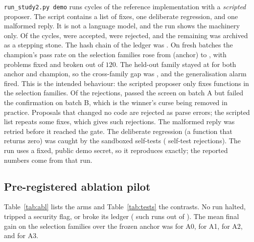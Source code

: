 \documentclass[11pt]{article}
\begin{document}
\texttt{run\_study2.py demo} runs \DemoCycles{} cycles of the reference implementation with a \emph{scripted} proposer. The script contains a list of fixes, one deliberate regression, and one malformed reply. It is not a language model, and the run shows the machinery only.
Of the \DemoCycles{} cycles, \DemoAcc{} were accepted, \DemoRej{} were rejected, and the remaining \DemoStep{} was archived as a stepping stone. The hash chain of the ledger was \DemoLedger.
On fresh batches the champion's pass rate on the selection families rose from \DemoAnchor{} (anchor) to \DemoChamp{}, with \DemoFixed{} problems fixed and \DemoBroken{} broken out of $120$.
The held-out family stayed at \DemoHeldA{} for both anchor and champion, so the cross-family gap was \DemoGap{}, and the generalisation alarm fired. This is the intended behaviour: the scripted proposer only fixes functions in the selection families.
Of the rejections, \DemoUnconf{} passed the screen on batch A but failed the confirmation on batch B, which is the winner's curse being removed in practice. Proposals that changed no code are rejected as parse errors; the scripted list repeats some fixes, which gives \DemoNoChange{} such rejections. The malformed reply was retried before it reached the gate. The deliberate regression (a function that returns zero) was caught by the sandboxed self-tests (\DemoSelftest{} self-test rejections). The run uses a fixed, public demo secret, so it reproduces exactly; the reported numbers come from that run.

\subsection{Pre-registered ablation pilot}
\label{sec:abl}

Table~\ref{tab:abl} lists the arms and Table~\ref{tab:tests} the contrasts. No run halted, tripped a security flag, or broke its ledger (\BadRuns{} such runs out of \RunsTotal{}).
The mean final gain on the selection families over the frozen anchor was \GainAZero{} for A0, \GainAOne{} for A1, \GainATwo{} for A2, and \GainAThree{} for A3.

\begin{table}[t]
\centering\small
\caption{Arms, mean $\pm$ standard deviation over \NSeeds{} seeds. Gain is the final pass rate minus the anchor's, on batches shared by all arms. Tokens include yield tests.}
\label{tab:abl}

\end{table}

\begin{table}[t]
\centering\small
\caption{Pre-registered contrasts, paired by seed. The p-values are one-sided sign-flip tests. Holm correction is applied across H1--H3. The confidence intervals are 95\% bootstrap intervals of the mean paired difference.}
\label{tab:tests}

\end{table}
\end{document}
